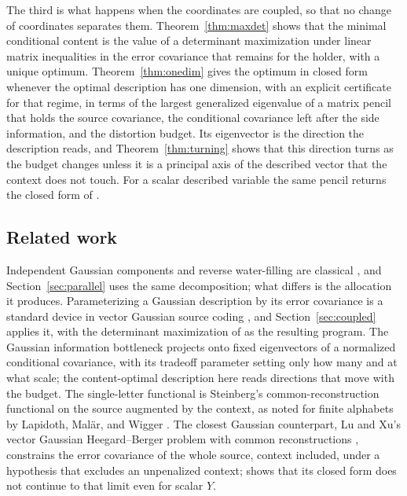 \documentclass[11pt,onecolumn]{IEEEtran}
\begin{document}
The third is what happens when the coordinates are coupled, so that no
change of coordinates separates them. Theorem~\ref{thm:maxdet} shows that
the minimal conditional content is the value of a determinant
maximization under linear matrix inequalities in the error covariance that
remains for the holder, with a unique optimum.
Theorem~\ref{thm:onedim} gives the optimum in closed form whenever the
optimal description has one dimension, with an explicit certificate for
that regime, in terms of the largest generalized eigenvalue of a matrix pencil that
holds the source covariance, the conditional covariance left after the
side information, and the distortion budget. Its eigenvector is the
direction the description reads, and Theorem~\ref{thm:turning} shows that
this direction turns as the budget changes unless it is a principal axis
of the described vector that the context does not touch. For a scalar
described variable the same pencil returns the closed form of
\cite{bond2026tit}.

\subsection*{Related work}

Independent Gaussian components and reverse water-filling are classical
\cite{berger1971}, and Section~\ref{sec:parallel} uses the same
decomposition; what differs is the allocation it produces. Parameterizing
a Gaussian description by its error covariance is a standard device in
vector Gaussian source coding \cite{rahman2012}, and
Section~\ref{sec:coupled} applies it, with the determinant maximization of
\cite{vandenberghe1998} as the resulting program. The Gaussian information
bottleneck \cite{chechik2005} projects onto fixed eigenvectors of a
normalized conditional covariance, with its tradeoff parameter setting
only how many and at what scale; the content-optimal description here
reads directions that move with the budget. The single-letter functional
is Steinberg's common-reconstruction functional \cite{steinberg2009} on
the source augmented by the context, as noted for finite alphabets by
Lapidoth, Mal\"ar, and Wigger \cite{lapidoth2014}. The closest Gaussian
counterpart, Lu and Xu's vector Gaussian Heegard--Berger problem with
common reconstructions \cite{luxu2021}, constrains the error covariance
of the whole source, context included, under a hypothesis that excludes an
unpenalized context; \cite[Appendix~C]{bond2026tit} shows that its closed
form does not continue to that limit even for scalar $Y$.
\end{document}
